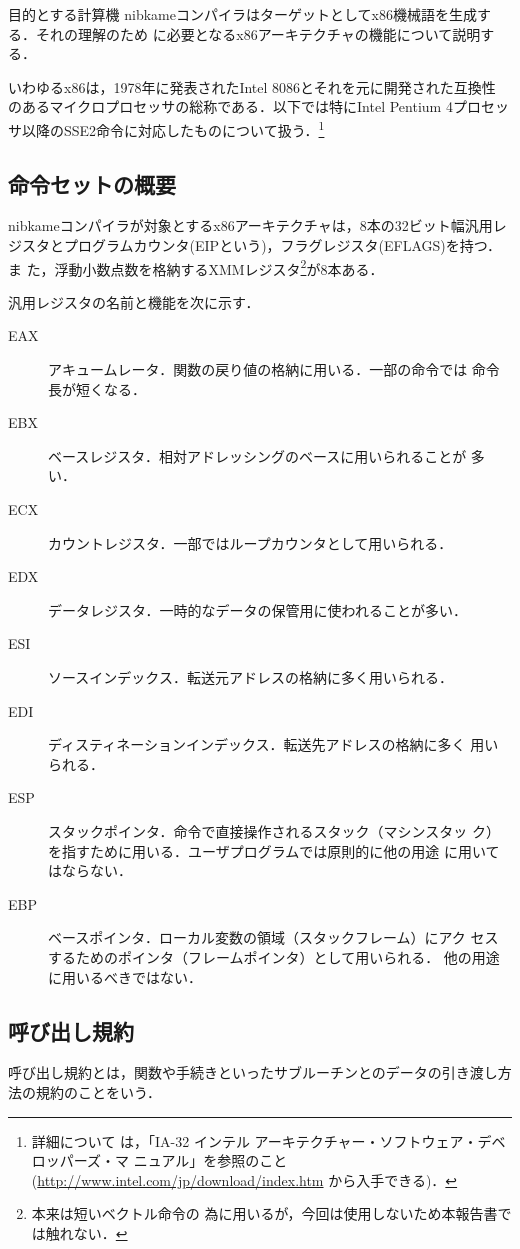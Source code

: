 \documentclass[a4paper,titlepage,report]{jsbook}
\begin{document}
\begin{resbonsiblesection}{目的とする計算機}{\kobori}\label{sc:target-machine}
nibkameコンパイラはターゲットとしてx86機械語を生成する．それの理解のため
に必要となるx86アーキテクチャの機能について説明する．

いわゆるx86は，1978年に発表されたIntel 8086とそれを元に開発された互換性
のあるマイクロプロセッサの総称である．以下では特にIntel Pentium 4プロセッ
サ以降のSSE2命令に対応したものについて扱う．\footnote{詳細について
は，「IA-32 インテル アーキテクチャー・ソフトウェア・デベロッパーズ・マ
ニュアル」を参照のこと(\url{http://www.intel.com/jp/download/index.htm}
から入手できる)．}

\subsection{命令セットの概要}\label{ssc:instruction_set}
nibkameコンパイラが対象とするx86アーキテクチャは，8本の32ビット幅汎用レ
ジスタとプログラムカウンタ(EIPという)，フラグレジスタ(EFLAGS)を持つ．ま
た，浮動小数点数を格納するXMMレジスタ\footnote{本来は短いベクトル命令の
為に用いるが，今回は使用しないため本報告書では触れない．}が8本ある．

汎用レジスタの名前と機能を次に示す．
\begin{description}
 \item[EAX] アキュームレータ．関数の戻り値の格納に用いる．一部の命令では
	    命令長が短くなる．
 \item[EBX] ベースレジスタ．相対アドレッシングのベースに用いられることが
	    多い．
 \item[ECX] カウントレジスタ．一部ではループカウンタとして用いられる．
 \item[EDX] データレジスタ．一時的なデータの保管用に使われることが多い．
 \item[ESI] ソースインデックス．転送元アドレスの格納に多く用いられる．
 \item[EDI] ディスティネーションインデックス．転送先アドレスの格納に多く
	    用いられる．
 \item[ESP] スタックポインタ．命令で直接操作されるスタック（マシンスタッ
	    ク）を指すために用いる．ユーザプログラムでは原則的に他の用途
	    に用いてはならない．
 \item[EBP] ベースポインタ．ローカル変数の領域（スタックフレーム）にアク
	    セスするためのポインタ（フレームポインタ）として用いられる．
	    他の用途に用いるべきではない． 
\end{description}

\subsection{呼び出し規約}\label{ssc:calling-convention}
呼び出し規約とは，関数や手続きといったサブルーチンとのデータの引き渡し方
法の規約のことをいう．


\end{resbonsiblesection}
\end{document}

